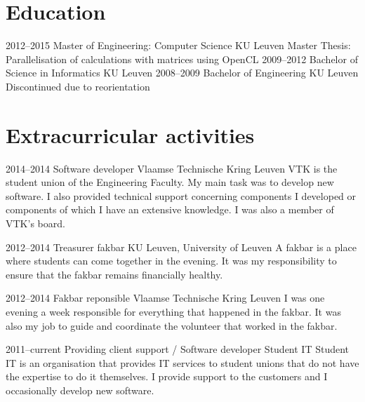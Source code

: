 \documentclass[]{friggeri-cv} %
\begin{document}
\section{Education}

\begin{entrylist}
\entry
{2012--2015}
{Master of Engineering: Computer Science}
{KU Leuven}
{Master Thesis: Parallelisation of calculations with matrices using OpenCL}
\entry
{2009--2012}
{Bachelor of Science in Informatics}
{KU Leuven}
{}
\entry
{2008--2009}
{Bachelor of Engineering}
{KU Leuven}
{Discontinued due to reorientation}
\end{entrylist}



\section{Extracurricular activities}

\begin{entrylist}
\entry
{2014--2014}
{Software developer}
{Vlaamse Technische Kring Leuven}
{VTK is the student union of the Engineering Faculty. My main task was to develop new software. I also provided technical support concerning components I developed or components of which I have an extensive knowledge. I was also a member of VTK’s board.}

\entry
{2012--2014}
{Treasurer fakbar}
{KU Leuven, University of Leuven}
{A fakbar is a place where students can come together in the evening. It was my responsibility to ensure that the fakbar remains financially healthy.}

\entry
{2012--2014}
{Fakbar reponsible}
{Vlaamse Technische Kring Leuven}
{I was one evening a week responsible for everything that happened in the fakbar. It was also my job to guide and coordinate the volunteer that worked in the fakbar.}

\entry
{2011--current}
{Providing client support / Software developer}
{Student IT}
{Student IT is an organisation that provides IT services to student unions that do not have the expertise to do it themselves. I provide support to the customers and I occasionally develop new software.}

\end{entrylist}
\end{document}
